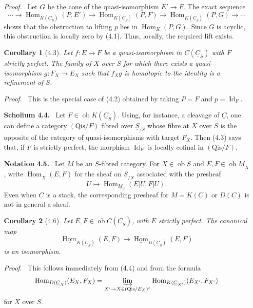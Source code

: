 \documentclass[13pt]{extarticle}
\newcommand{\uS}{\underline S}
\newcommand{\uC}{\underline C}
\newcommand{\ob}{\operatorname{ob}}
\newcommand{\Hom}{\operatorname{Hom}}
\newenvironment{statement}[1]{\par\medskip\noindent\textbf{#1.}\ }{\par\medskip}
\newenvironment{prooftext}[1][Proof]{\par\noindent\emph{#1.}\ }{\par\medskip}
\newtheorem*{corollary*}{Corollary}
\begin{document}
\begin{prooftext}
Let $G$ be the cone of the quasi-isomorphism $E'\to F$. The exact sequence
\[
\cdots\to\Hom_{K(\uC_S)}(P,E')\to
\Hom_{K(\uC_S)}(P,F)\to
\Hom_{K(\uC_S)}(P,G)\to\cdots
\]
shows that the obstruction to lifting $p$ lies in $\Hom_K(P,G)$. Since $G$ is acyclic, this obstruction is locally zero by (4.1). Thus, locally, the required lift exists.
\end{prooftext}

\begin{corollary*}[4.3]
Let $f:E\to F$ be a quasi-isomorphism in $C(\uC_S)$ with $F$ strictly perfect. The family of $X$ over $S$ for which there exists a quasi-isomorphism $g:F_X\to E_X$ such that $f_Xg$ is homotopic to the identity is a refinement of $S$.
\end{corollary*}

\begin{prooftext}
This is the special case of (4.2) obtained by taking $P=F$ and $p=\operatorname{Id}_F$.
\end{prooftext}

\begin{statement}{Scholium 4.4}
Let $F\in\ob K(\uC_S)$. Using, for instance, a cleavage of $\uC$, one can define a category $(\mathrm{Qis}/F)$ fibred over $\uS_{/S}$ whose fibre at $X$ over $S$ is the opposite of the category of quasi-isomorphisms with target $F_X$. Then (4.3) says that, if $F$ is strictly perfect, the morphism $\operatorname{Id}_F$ is locally cofinal in $(\mathrm{Qis}/F)$.
\end{statement}

\begin{statement}{Notation 4.5}
Let $\underline M$ be an $\uS$-fibred category. For $X\in\ob\uS$ and $E,F\in\ob\underline M_X$, write $\underline{\Hom}_X(E,F)$ for the sheaf on $\uS_{/X}$ associated with the presheaf
\[
U\longmapsto \Hom_{\underline M_U}(E|U,F|U).
\]
Even when $\uC$ is a stack, the corresponding presheaf for $\underline M=K(\uC)$ or $D(\uC)$ is not in general a sheaf.
\end{statement}

\begin{corollary*}[4.6]
Let $E,F\in\ob C(\uC_S)$, with $E$ strictly perfect. The canonical map
\[
\underline{\Hom}_{K(\uC_S)}(E,F)\longrightarrow
\underline{\Hom}_{D(\uC_S)}(E,F)
\]
is an isomorphism.
\end{corollary*}

\begin{prooftext}
This follows immediately from (4.4) and from the formula
\[
\Hom_{D(\uC_X)}(E_X,F_X)=
\varinjlim_{X'\to X\in(\mathrm{Qis}/E_X)^\circ}
\Hom_{K(\uC_{X'})}(E_{X'},F_{X'})
\]
for $X$ over $S$.
\end{prooftext}
\end{document}
